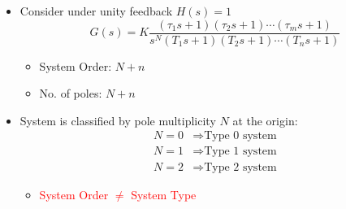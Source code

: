 \documentclass[a4paper]{article}
\begin{document}
\begin{itemize}
    \item Consider under unity feedback $H(s) = 1$
    $$G(s) = K\frac{(\tau_1s+1)(\tau_2s+1)\cdots(\tau_ms+1)}{s^N(T_1s+1)(T_2s+1)\cdots(T_ns+1)}$$
    \begin{itemize}[label=$\circ$]
        \item System Order: $N+n$
        \item No. of poles: $N+n$
    \end{itemize}
    \item System is classified by pole multiplicity $N$ at the origin:
    \begin{align*}
        N = 0 & \Rightarrow \text{Type 0 system}\\
        N = 1 & \Rightarrow \text{Type 1 system}\\
        N = 2 & \Rightarrow \text{Type 2 system}
    \end{align*}
    \begin{itemize}[label=$\circ$]
        \item \textcolor{red}{System Order $\neq$ System Type}
    \end{itemize}
\end{itemize}
\end{document}
